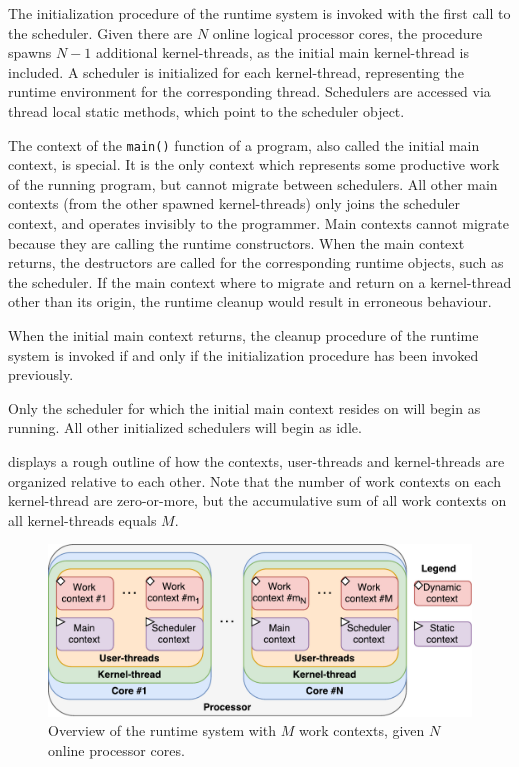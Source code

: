 The initialization procedure of the runtime system is invoked with the first call to the scheduler. Given there are $N$ online logical processor cores, the procedure spawns $N-1$ additional kernel\hyp{}threads, as the initial main kernel\hyp{}thread is included. A scheduler is initialized for each kernel\hyp{}thread, representing the runtime environment for the corresponding thread. Schedulers are accessed via thread local static methods, which point to the scheduler object.

The context of the \texttt{main()} function of a program, also called the initial main context, is special. It is the only context which represents some productive work of the running program, but cannot migrate between schedulers. All other main contexts (from the other spawned kernel\hyp{}threads) only joins the scheduler context, and operates invisibly to the programmer. Main contexts cannot migrate because they are calling the runtime constructors. When the main context returns, the destructors are called for the corresponding runtime objects, such as the scheduler. If the main context where to migrate and return on a kernel\hyp{}thread other than its origin, the runtime cleanup would result in erroneous behaviour.

When the initial main context returns, the cleanup procedure of the runtime system is invoked if and only if the initialization procedure has been invoked previously.

Only the scheduler for which the initial main context resides on will begin as running. All other initialized schedulers will begin as idle.

 displays a rough outline of how the contexts, user\hyp{}threads and kernel\hyp{}threads are organized relative to each other. Note that the number of work contexts on each kernel\hyp{}thread are zero\hyp{}or\hyp{}more, but the accumulative sum of all work contexts on all kernel\hyp{}threads equals $M$.

\begin{figure}[h!]
    \centering
    \includegraphics[width=0.9\linewidth]{fig/runtime_overview}
    \caption{Overview of the runtime system with $M$ work contexts, given $N$ online processor cores.}
    \label{fig:runtime_overview}
\end{figure}


